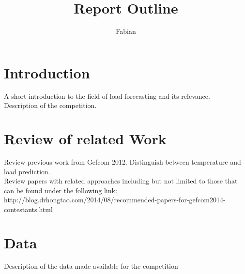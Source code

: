 \documentclass{article}
\begin{document}
\title{Report Outline}
\author{Fabian}

\maketitle


\section{Introduction}
A short introduction to the field of load forecasting and its relevance.\\
Description of the competition.

\section{Review of related Work}
Review previous work from Gefcom 2012. Distinguish between temperature and load prediction.\\
Review papers with related approaches including but not limited to those that can be found under the following link: http://blog.drhongtao.com/2014/08/recommended-papers-for-gefcom2014-contestants.html

\section{Data}
Description of the data made available for the competition
\end{document}
